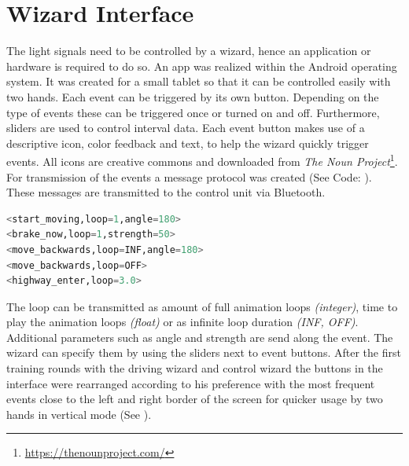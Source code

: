 \section{Wizard Interface}
\label{sec:wizard}
The light signals need to be controlled by a wizard, hence an application or hardware is required to do so. An app was realized within the Android operating system. It was created for a small tablet so that it can be controlled easily with two hands. Each event can be triggered by its own button. Depending on the type of events these can be triggered once or turned on and off. Furthermore, sliders are used to control interval data. Each event button makes use of a descriptive icon, color feedback and text, to help the wizard quickly trigger events. All icons are creative commons and downloaded from \emph{The Noun Project}\footnote{\url{https://thenounproject.com/}}. For transmission of the events a message protocol was created (See Code: \emph{}). These messages are transmitted to the control unit via Bluetooth. 

\begin{lstlisting}[caption={Examples of event messages.},label={lst:eventmessage},language=Python]
<start_moving,loop=1,angle=180>
<brake_now,loop=1,strength=50>
<move_backwards,loop=INF,angle=180>
<move_backwards,loop=OFF>
<highway_enter,loop=3.0>
\end{lstlisting}

The loop can be transmitted as amount of full animation loops \emph{(integer)}, time to play the animation loops \emph{(float)} or as infinite loop duration \emph{(INF, OFF)}. Additional parameters such as angle and strength are send along the event. The wizard can specify them by using the sliders next to event buttons.   
After the first training rounds with the driving wizard and control wizard the buttons in the interface were rearranged according to his preference with the most frequent events close to the left and right border of the screen for quicker usage by two hands in vertical mode (See  \emph{}). 


